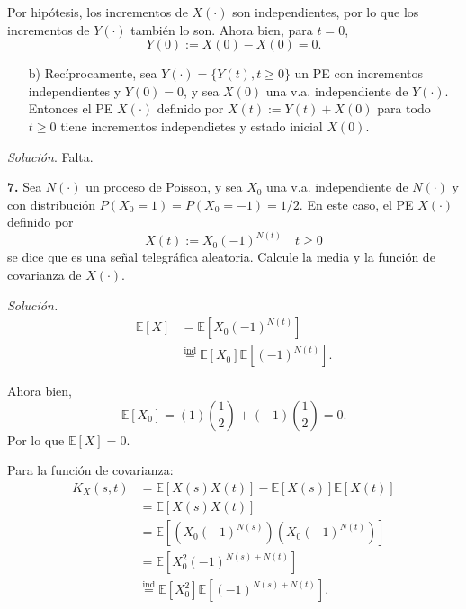 \documentclass[12pt]{article}
\newcommand{\E}{\mathbb{E}}
\begin{document}
Por hipótesis, los incrementos de $X(\cdot)$ son independientes, por lo que los incrementos de $Y(\cdot)$ también lo son. Ahora bien, para $t=0$,
\[ Y(0) := X(0)-X(0) = 0. \]

\begin{tcolorbox}[colback=blue!5!white, colframe=blue!5!white, arc=0mm, boxrule=0pt]
\begin{itemize}
    \item[b)] Recíprocamente, sea $Y(\cdot) = \{ Y(t), t \geq 0 \}$ un PE con incrementos independientes y $Y(0)=0$, y sea $X(0)$ una v.a. independiente de $Y(\cdot)$. Entonces el PE $X(\cdot)$ definido por $X(t):=Y(t)+X(0)$ para todo $t\geq 0$ tiene incrementos independietes y estado inicial $X(0)$.
\end{itemize}
\end{tcolorbox}

\textit{Solución}. Falta.

\begin{tcolorbox}[colback=blue!5!white, colframe=blue!5!white, arc=0mm, boxrule=0pt]
\textbf{7.} Sea $N(\cdot)$ un proceso de Poisson, y sea $X_0$ una v.a. independiente de $N(\cdot)$ y con distribución $P(X_0=1) = P(X_0=-1) = 1/2$. En este caso, el PE $X(\cdot)$ definido por
\[ X(t) := X_0 (-1)^{N(t)} \quad t\geq0 \]
se dice que es una señal telegráfica aleatoria. Calcule la media y la función de covarianza de $X(\cdot)$.
\end{tcolorbox}

\textit{Solución.}
\begin{align*}
    \E[X] &= \E[X_0(-1)^{N(t)}] \\
    &\overset{\mathrm{ind}}{=} \E[X_0]\E[(-1)^{N(t)}].
\end{align*}

Ahora bien,
\[ \E[X_0] = (1)\left(\frac{1}{2}\right) + (-1)\left(\frac{1}{2}\right) = 0. \]
Por lo que $\E[X] = 0$.

Para la función de covarianza:
\begin{align*}
    K_X(s,t) &= \E[X(s)X(t)] - \E[X(s)] \E[X(t)] \\
    &= \E[X(s)X(t)] \\
    &= \E[(X_0(-1)^{N(s)})(X_0(-1)^{N(t)})] \\
    &= \E[X_0^2(-1)^{N(s)+N(t)}] \\
    &\overset{\mathrm{ind}}{=} \E[X_0^2]\E[(-1)^{N(s)+N(t)}].
\end{align*}
\end{document}

